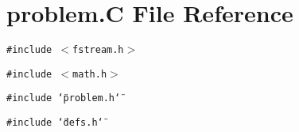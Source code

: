 \section{problem.C File Reference}
\label{problem_C}
{\tt \#include $<$fstream.h$>$}\par
{\tt \#include $<$math.h$>$}\par
{\tt \#include \char`\"{}problem.h\char`\"{}}\par
{\tt \#include \char`\"{}defs.h\char`\"{}}\par
